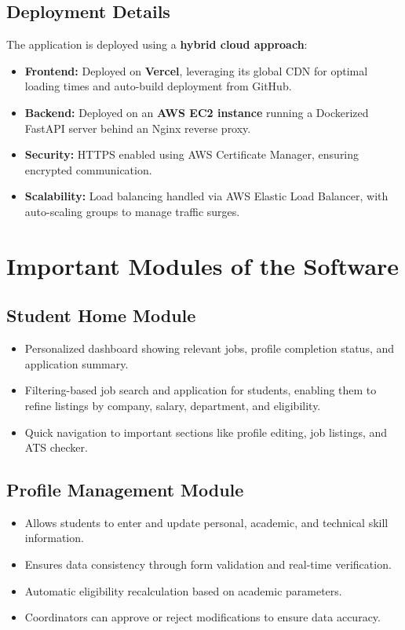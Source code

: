 \documentclass[14pt]{extarticle}
\begin{document}
\subsection{Deployment Details}
The application is deployed using a \textbf{hybrid cloud approach}:
\begin{itemize}
  \item \textbf{Frontend:} Deployed on \textbf{Vercel}, leveraging its global CDN for optimal loading times and auto-build deployment from GitHub.
  \item \textbf{Backend:} Deployed on an \textbf{AWS EC2 instance} running a Dockerized FastAPI server behind an Nginx reverse proxy.
  \item \textbf{Security:} HTTPS enabled using AWS Certificate Manager, ensuring encrypted communication.
  \item \textbf{Scalability:} Load balancing handled via AWS Elastic Load Balancer, with auto-scaling groups to manage traffic surges.
\end{itemize}

\clearpage

\section{Important Modules of the Software}
\subsection{Student Home Module}
\begin{itemize}
  \item Personalized dashboard showing relevant jobs, profile completion status, and application summary.
  \item Filtering-based job search and application for students, enabling them to refine listings by company, salary, department, and eligibility.
  \item Quick navigation to important sections like profile editing, job listings, and ATS checker.
  
\end{itemize}

\subsection{Profile Management Module}
\begin{itemize}
  \item Allows students to enter and update personal, academic, and technical skill information.
  \item Ensures data consistency through form validation and real-time verification.
  \item Automatic eligibility recalculation based on academic parameters.
  \item Coordinators can approve or reject modifications to ensure data accuracy.
\end{itemize}
\end{document}
